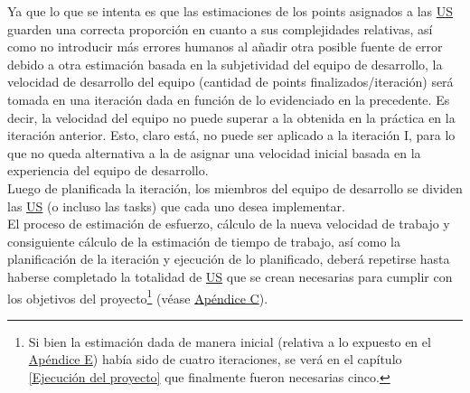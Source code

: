 \documentclass[a4paper, 12pt,twoside]{report}  %
\numberwithin{equation}{subsection} %
\begin{document}
\indent Ya que lo que se intenta es que las estimaciones de los points asignados a las \hyperlink{US}{US} guarden una correcta proporción en cuanto a sus complejidades relativas, así como no introducir más errores humanos al añadir otra posible fuente de error debido a otra estimación basada en la subjetividad del equipo de desarrollo, la velocidad de desarrollo del equipo (cantidad de points finalizados/iteración) será tomada en una iteración dada en función de lo evidenciado en la precedente. Es decir, la velocidad del equipo no puede superar a la obtenida en la práctica en la iteración anterior. Esto, claro está, no puede ser aplicado a la iteración I, para lo que no queda alternativa a la de asignar una velocidad inicial basada en la experiencia del equipo de desarrollo.\\
\indent Luego de planificada la iteración, los miembros del equipo de desarrollo se dividen las \hyperlink{US}{US} (o incluso las tasks) que cada uno desea implementar.\\
\indent El proceso de estimación de esfuerzo, cálculo de la nueva velocidad de trabajo y consiguiente cálculo de la estimación de tiempo de trabajo, así como la planificación de la iteración y ejecución de lo planificado, deberá repetirse hasta haberse completado la totalidad de \hyperlink{US}{US} que se crean necesarias para cumplir con los objetivos del proyecto\renewcommand*{\thefootnote}{\fnsymbol{footnote}}\footnote[1]{Si bien la estimación dada de manera inicial (relativa a lo expuesto en el \hyperlink{apendice_e}{Apéndice E}) había sido de cuatro iteraciones, se verá en el capítulo \ref{Ejecución del proyecto} que finalmente fueron necesarias cinco.}\renewcommand*{\thefootnote}{\arabic{footnote}} (véase \hyperlink{apendice_c}{Apéndice C}).
\end{document}
